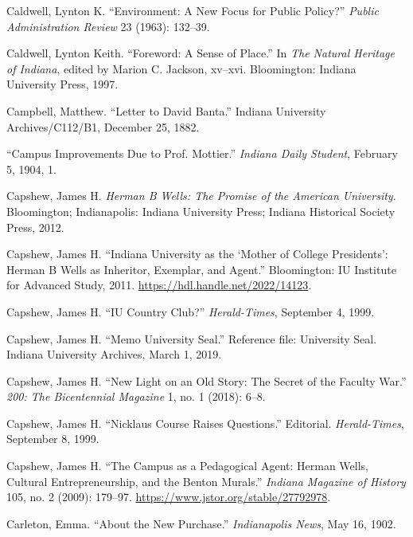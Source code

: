 \documentclass[
  american,
  letterpaper,
]{scrreprt}
\newlength{\cslhangindent}
\newenvironment{CSLReferences}[2] %
 {\begin{list}{}{%
  \setlength{\itemindent}{0pt}
  \setlength{\leftmargin}{0pt}
  \setlength{\parsep}{0pt}
  \ifodd #1
   \setlength{\leftmargin}{\cslhangindent}
   \setlength{\itemindent}{-1\cslhangindent}
  \fi
  \setlength{\itemsep}{#2\baselineskip}}}
 {\end{list}}
\begin{document}
\begin{CSLReferences}{1}{0}
Caldwell, Lynton K. {``Environment: A New Focus for Public Policy?''}
\emph{Public Administration Review} 23 (1963): 132--39.

Caldwell, Lynton Keith. {``Foreword: A Sense of Place.''} In \emph{The
Natural Heritage of Indiana}, edited by Marion C. Jackson, xv--xvi.
Bloomington: Indiana University Press, 1997.

Campbell, Matthew. {``Letter to David Banta.''} Indiana University
Archives/C112/B1, December 25, 1882.

{``Campus Improvements Due to Prof. Mottier.''} \emph{Indiana Daily
Student}, February 5, 1904, 1.

Capshew, James H. \emph{Herman {B} Wells: The Promise of the American
University}. Bloomington; Indianapolis: Indiana University Press;
Indiana Historical Society Press, 2012.

Capshew, James H. {``{Indiana University as the {`Mother of College
Presidents'}: Herman {B} Wells as Inheritor, Exemplar, and Agent}.''}
Bloomington: IU Institute for Advanced Study, 2011.
\url{https://hdl.handle.net/2022/14123}.

Capshew, James H. {``IU Country Club?''} \emph{Herald-Times}, September
4, 1999.

Capshew, James H. {``Memo University Seal.''} Reference file: University
Seal. Indiana University Archives, March 1, 2019.

Capshew, James H. {``New Light on an Old Story: The Secret of the
Faculty War.''} \emph{200: The Bicentennial Magazine} 1, no. 1 (2018):
6--8.

Capshew, James H. {``Nicklaus Course Raises Questions.''} Editorial.
\emph{Herald-Times}, September 8, 1999.

Capshew, James H. {``The Campus as a Pedagogical Agent: Herman Wells,
Cultural Entrepreneurship, and the Benton Murals.''} \emph{Indiana
Magazine of History} 105, no. 2 (2009): 179--97.
\url{https://www.jstor.org/stable/27792978}.

Carleton, Emma. {``About the New Purchase.''} \emph{Indianapolis News},
May 16, 1902.


\end{CSLReferences}
\end{document}

